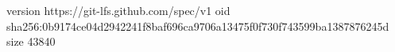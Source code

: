 version https://git-lfs.github.com/spec/v1
oid sha256:0b9174ce04d2942241f8baf696ca9706a13475f0f730f743599ba1387876245d
size 43840
